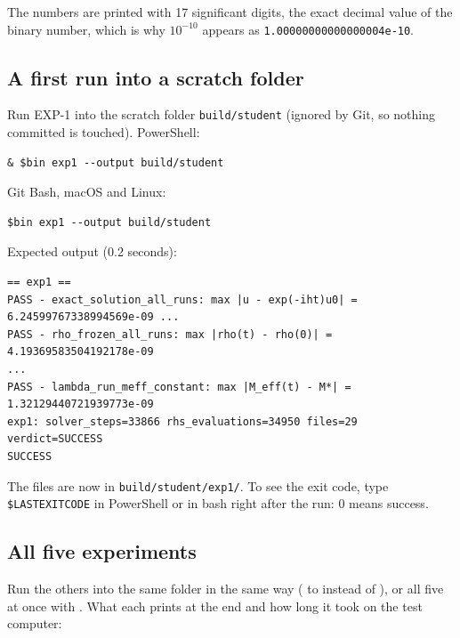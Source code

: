 \documentclass[11pt]{article}
\begin{document}
The numbers are printed with 17 significant digits, the exact decimal value of the binary number, which is why $10^{-10}$ appears as \texttt{1.000000\allowbreak{}00000000\allowbreak{}004e-10}.

\subsection{A first run into a scratch folder}

Run EXP-1 into the scratch folder \texttt{build/st\allowbreak{}udent} (ignored by Git, so nothing committed is touched). PowerShell:

\begin{Verbatim}[fontsize=\small]
& $bin exp1 --output build/student
\end{Verbatim}

Git Bash, macOS and Linux:

\begin{Verbatim}[fontsize=\small]
$bin exp1 --output build/student
\end{Verbatim}

Expected output (0.2 seconds):

\begin{Verbatim}[fontsize=\small]
== exp1 ==
PASS - exact_solution_all_runs: max |u - exp(-iht)u0| = 6.24599767338994569e-09 ...
PASS - rho_frozen_all_runs: max |rho(t) - rho(0)| = 4.19369583504192178e-09
...
PASS - lambda_run_meff_constant: max |M_eff(t) - M*| = 1.32129440721939773e-09
exp1: solver_steps=33866 rhs_evaluations=34950 files=29 verdict=SUCCESS
SUCCESS
\end{Verbatim}

The files are now in \texttt{build/st\allowbreak{}udent/ex\allowbreak{}p1/}. To see the exit code, type \texttt{\$LASTEXI\allowbreak{}TCODE} in PowerShell or \texttt{} in bash right after the run: 0 means success.

\subsection{All five experiments}

Run the others into the same folder in the same way (\texttt{} to \texttt{} instead of \texttt{}), or all five at once with \texttt{}. What each prints at the end and how long it took on the test computer:
\end{document}
